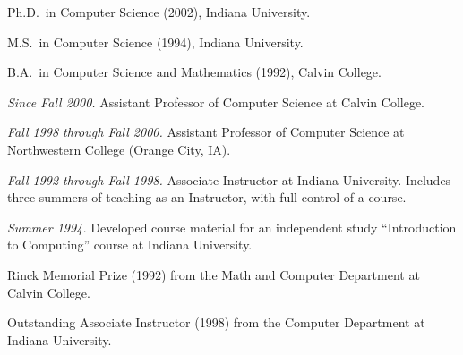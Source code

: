 \documentclass[ComputerScience]{vita}
\begin{document}
\begin{vita}



\begin{Degrees}
\item Ph.D.\ in Computer Science (2002), Indiana University.
\item M.S.\ in Computer Science (1994), Indiana University.
\item B.A.\ in Computer Science and Mathematics (1992), Calvin College.
\end{Degrees}




\begin{Experience}

\item \emph{Since Fall 2000.}  Assistant Professor of Computer
  Science at Calvin College.

\item \emph{Fall 1998 through Fall 2000.}  Assistant Professor of
  Computer Science at Northwestern College (Orange City, IA).

\item \emph{Fall 1992 through Fall 1998.}  Associate Instructor at
  Indiana University.  Includes three summers of teaching as an
  Instructor, with full control of a course.

\item \emph{Summer 1994.}  Developed course material for an
  independent study ``Introduction to Computing'' course at Indiana
  University.

\end{Experience}




\begin{Honors}

\item Rinck Memorial Prize (1992) from the Math and Computer
  Department at Calvin College.

\item Outstanding Associate Instructor (1998) from the Computer
  Department at Indiana University.

\end{Honors}


\newpage



\begin{Publications}


\end{Publications}
\end{vita}
\end{document}
